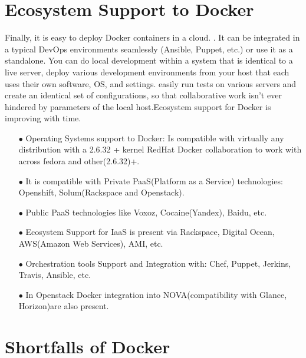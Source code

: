 \documentclass[9pt,twocolumn,twoside]{../../styles/osajnl}
\begin{document}
\section{Ecosystem Support to Docker}
Finally, it is easy to deploy Docker containers in a cloud.
\cite{www-docker-1}. It can be integrated in a typical DevOps
environments seamlessly (Ansible, Puppet, etc.) or use it as a
standalone. You can do local development within a system that is
identical to a live server, deploy various development environments
from your host that each uses their own software, OS, and settings.
easily run tests on various servers and create an identical set of
configurations, so that collaborative work isn’t ever hindered by
parameters of the local host.Ecosystem support for Docker is improving
with time.
\begin{itemize}
\item[$\bullet$]Operating Systems support to Docker: Is compatible
  with virtually any distribution with a 2.6.32 + kernel RedHat Docker
  collaboration to work with across fedora and other(2.6.32)+.

\item[$\bullet$]It is compatible with Private PaaS(Platform as a
  Service) technologies: Openshift, Solum(Rackspace and Openstack).

\item[$\bullet$]Public PaaS technologies like Voxoz,
   Cocaine(Yandex), Baidu, etc.

\item[$\bullet$]Ecosystem Support for IaaS is present via Rackspace,
  Digital Ocean, AWS(Amazon Web Services), AMI, etc.

\item[$\bullet$]Orchestration tools Support and Integration with:
  Chef, Puppet, Jerkins, Travis, Ansible, etc.

\item[$\bullet$]In Openstack Docker integration into
  NOVA(compatibility with Glance, Horizon)are also present.
\end{itemize}
\section{Shortfalls of Docker}
\end{document}
